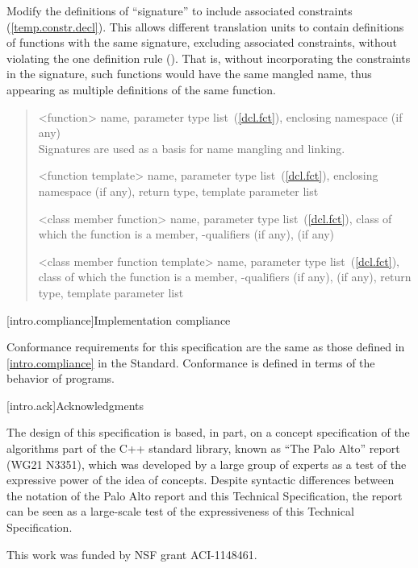 Modify the definitions of ``signature'' to include associated
constraints (\ref{temp.constr.decl}). This allows different translation units
to contain definitions of functions with the same signature, excluding 
associated constraints, without violating the one definition rule 
(). That is, without incorporating the constraints
in the signature, such functions would have the same mangled name, thus
appearing as multiple definitions of the same function.

\begin{quote}
%
<function> name, parameter type list~(\ref{dcl.fct}),  enclosing 
namespace (if any)\\
\enternote Signatures are used as a basis for
name mangling and linking.\exitnote

%
<function template> name, parameter type list~(\ref{dcl.fct}), enclosing namespace (if any),
return type,  template parameter list

%
<class member function> name, parameter type list~(\ref{dcl.fct}), class of which the
function is a member, \cv-qualifiers (if any),
  (if any)

%
<class member function template> name, parameter type list~(\ref{dcl.fct}), class of which the
function is a member, \cv-qualifiers (if any),
 (if any), return type,  template 
parameter list
\end{quote}

[intro.compliance]{Implementation compliance}

\pnum
Conformance requirements for this specification are the same as those 
defined in \ref{intro.compliance} in the \Cpp Standard.
\enternote 
Conformance is defined in terms of the behavior of programs.
\exitnote

[intro.ack]{Acknowledgments}

\pnum
The design of this specification is based, in part, on a concept 
specification of the algorithms part of the C++ standard library, known 
as ``The Palo Alto'' report (WG21 N3351), which was developed by a large 
group of experts as a test of the expressive power of the idea of 
concepts. Despite syntactic differences between the notation of the 
Palo Alto report and this Technical Specification, the report can be seen as a 
large-scale test of the expressiveness of this Technical Specification.

\pnum
This work was funded by NSF grant ACI-1148461.

